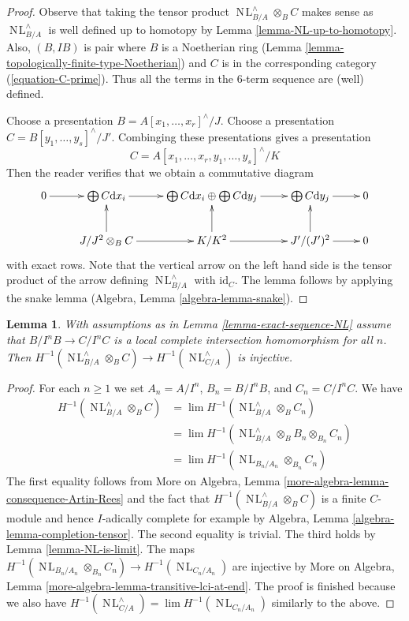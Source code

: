 \documentclass{stacks-project}
\theoremstyle{plain}
\newtheorem{lemma}[subsection]{Lemma}
\theoremstyle{definition}
\theoremstyle{remark}
\numberwithin{equation}{subsection}
\def\lim{\mathop{\mathrm{lim}}\nolimits}
\def\NL{\mathop{N\!L}\nolimits}
\begin{document}
\begin{proof}
Observe that taking the tensor product $\NL_{B/A}^\wedge \otimes_B C$
makes sense as $\NL_{B/A}^\wedge$ is well defined up to homotopy by
Lemma \ref{lemma-NL-up-to-homotopy}.
Also, $(B, IB)$ is pair where $B$ is a Noetherian ring
(Lemma \ref{lemma-topologically-finite-type-Noetherian})
and $C$ is in the corresponding category (\ref{equation-C-prime}).
Thus all the terms in the $6$-term sequence are (well) defined.

\medskip\noindent
Choose a presentation $B = A[x_1, \ldots, x_r]^\wedge/J$.
Choose a presentation $C = B[y_1, \ldots, y_s]^\wedge/J'$.
Combinging these presentations gives a presentation
$$
C = A[x_1, \ldots, x_r, y_1, \ldots, y_s]^\wedge/K
$$
Then the reader verifies that we obtain a commutative diagram
$$
\xymatrix{
0 \ar[r] &
\bigoplus C \text{d}x_i \ar[r] &
\bigoplus C \text{d}x_i \oplus \bigoplus C \text{d}y_j \ar[r] &
\bigoplus C \text{d}y_j \ar[r] &
0 \\
&
J/J^2 \otimes_B C \ar[r] \ar[u] &
K/K^2 \ar[r] \ar[u] &
J'/(J')^2 \ar[r] \ar[u] &
0
}
$$
with exact rows. Note that the vertical arrow on the left hand side
is the tensor product of the arrow defining $\NL_{B/A}^\wedge$ with
$\text{id}_C$. The lemma follows by applying the snake lemma
(Algebra, Lemma \ref{algebra-lemma-snake}).
\end{proof}

\begin{lemma}
\label{lemma-transitive-lci-at-end}
With assumptions as in Lemma \ref{lemma-exact-sequence-NL}
assume that $B/I^nB \to C/I^nC$ is a local complete intersection
homomorphism for all $n$. Then
$H^{-1}(\NL_{B/A}^\wedge \otimes_B C) \to H^{-1}(\NL_{C/A}^\wedge)$
is injective.
\end{lemma}

\begin{proof}
For each $n \geq 1$ we set $A_n = A/I^n$, $B_n = B/I^nB$, and
$C_n = C/I^nC$. We have
\begin{align*}
H^{-1}(\NL_{B/A}^\wedge \otimes_B C)
& =
\lim H^{-1}(\NL_{B/A}^\wedge \otimes_B C_n) \\
& =
\lim H^{-1}(\NL_{B/A}^\wedge \otimes_B B_n \otimes_{B_n} C_n) \\
& =
\lim H^{-1}(\NL_{B_n/A_n} \otimes_{B_n} C_n)
\end{align*}
The first equality follows from
More on Algebra, Lemma \ref{more-algebra-lemma-consequence-Artin-Rees}
and the fact that $H^{-1}(\NL_{B/A}^\wedge \otimes_B C)$ is a finite
$C$-module and hence $I$-adically complete for example by
Algebra, Lemma \ref{algebra-lemma-completion-tensor}.
The second equality is trivial.
The third holds by Lemma \ref{lemma-NL-is-limit}.
The maps $H^{-1}(\NL_{B_n/A_n} \otimes_{B_n} C_n) \to
H^{-1}(\NL_{C_n/A_n})$ are injective by
More on Algebra, Lemma \ref{more-algebra-lemma-transitive-lci-at-end}.
The proof is finished because we also have
$H^{-1}(\NL_{C/A}^\wedge) = \lim H^{-1}(\NL_{C_n/A_n})$
similarly to the above.
\end{proof}
\end{document}
